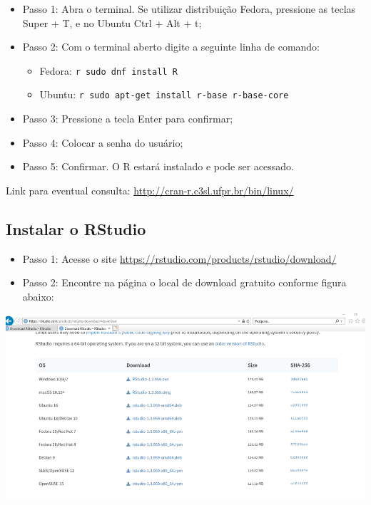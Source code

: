 \documentclass[
]{book}
\providecommand{\tightlist}{%
  \setlength{\itemsep}{0pt}\setlength{\parskip}{0pt}}
\begin{document}
\begin{itemize}
\tightlist
\item
  Passo 1: Abra o terminal. Se utilizar distribuição Fedora, pressione as teclas Super + T, e no Ubuntu Ctrl + Alt + t;\\
\item
  Passo 2: Com o terminal aberto digite a seguinte linha de comando:

  \begin{itemize}
  \tightlist
  \item
    Fedora: \texttt{r\ sudo\ dnf\ install\ R}
  \item
    Ubuntu: \texttt{r\ sudo\ apt-get\ install\ r-base\ r-base-core}\\
  \end{itemize}
\item
  Passo 3: Pressione a tecla Enter para confirmar;\\
\item
  Passo 4: Colocar a senha do usuário;\\
\item
  Passo 5: Confirmar. O R estará instalado e pode ser acessado.
\end{itemize}

Link para eventual consulta: \url{http://cran-r.c3sl.ufpr.br/bin/linux/}

\hypertarget{instalar-o-rstudio}{%
\subsection{Instalar o RStudio}\label{instalar-o-rstudio}}

\begin{itemize}
\tightlist
\item
  Passo 1: Acesse o site \url{https://rstudio.com/products/rstudio/download/}\\
\item
  Passo 2: Encontre na página o local de download gratuito conforme figura abaixo:
\end{itemize}

\includegraphics[width=13.54in]{img/inst_1_rstudio}
\end{document}
